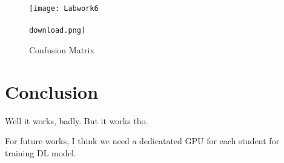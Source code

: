 \documentclass{article}
\begin{document}
    \begin{figure}[h!]
        \centering
        \texttt{[image: Labwork6\\\\download.png]}
        \caption{Confusion Matrix}
        \label{fig:confusion_matrix}
    \end{figure}

\section{Conclusion}
Well it works, badly. But it works tho.

For future works, I think we need a dedicatated GPU for each student for training DL model.
\end{document}
